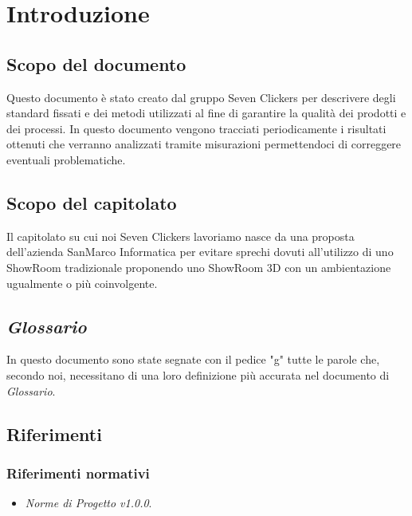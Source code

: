 \section{Introduzione}
\subsection{Scopo del documento}
Questo documento è stato creato dal gruppo Seven Clickers per descrivere degli standard fissati e dei metodi utilizzati al fine di garantire la qualità dei prodotti e dei processi.
In questo documento vengono tracciati periodicamente i risultati ottenuti che verranno analizzati tramite misurazioni permettendoci di correggere eventuali problematiche.

\subsection{Scopo del capitolato}
Il capitolato su cui noi Seven Clickers lavoriamo nasce da una proposta dell'azienda SanMarco Informatica per evitare sprechi dovuti all'utilizzo di uno ShowRoom tradizionale proponendo uno ShowRoom 3D con un ambientazione ugualmente o più coinvolgente.

\subsection{\textit{Glossario}}
In questo documento sono state segnate con il pedice "g" tutte le parole che, secondo noi, necessitano di una loro definizione più accurata nel documento di \textit{Glossario}.

\subsection{Riferimenti}
\subsubsection{Riferimenti normativi}
\begin{itemize}
\item \textit{Norme di Progetto v1.0.0}.
\end{itemize}

